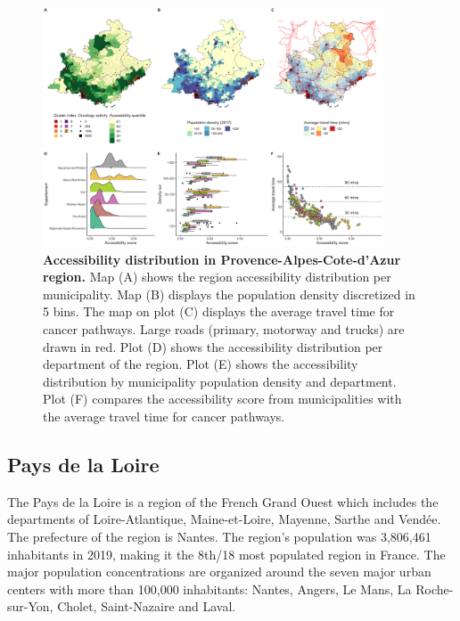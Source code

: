 \begin{figure}[H]
    \includegraphics[width=0.9\textwidth]{images/camion/fig4_accessibility_Provence-Alpes-Cote-d'Azur.png}
    \centering
    \caption{
        \textbf{Accessibility distribution in Provence-Alpes-Cote-d'Azur region.} Map (A) shows the region accessibility distribution per municipality. Map (B) displays the population density discretized in 5 bins. The map on plot (C) displays the average travel time for cancer pathways. Large roads (primary, motorway and trucks) are drawn in red. Plot (D) shows the accessibility distribution per department of the region. Plot (E) shows the accessibility distribution by municipality population density and department. Plot (F) compares the accessibility score from municipalities with the average travel time for cancer pathways.
    }
    \label{fig:accessibility-paca}
\end{figure}

\subsection*{Pays de la Loire}

The Pays de la Loire is a region of the French Grand Ouest which includes the departments of Loire-Atlantique, Maine-et-Loire, Mayenne, Sarthe and Vendée. The prefecture of the region is Nantes. The region's population was 3,806,461 inhabitants in 2019, making it the 8th/18 most populated region in France. The major population concentrations are organized around the seven major urban centers with more than 100,000 inhabitants: Nantes, Angers, Le Mans, La Roche-sur-Yon, Cholet, Saint-Nazaire and Laval.

